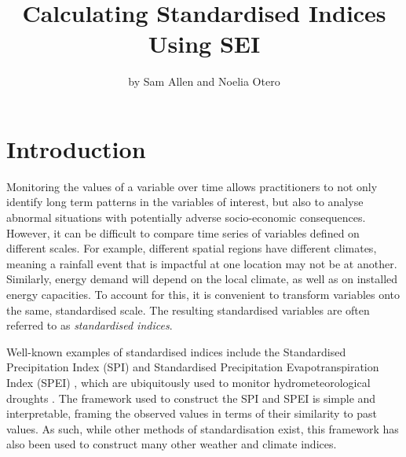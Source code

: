 \title{Calculating Standardised Indices Using SEI}


\author{by Sam Allen and Noelia Otero}

\maketitle


\section{Introduction}\label{introduction}

Monitoring the values of a variable over time allows practitioners to not only identify long term patterns in the variables of interest, but also to analyse abnormal situations with potentially adverse socio-economic consequences. However, it can be difficult to compare time series of variables defined on different scales. For example, different spatial regions have different climates, meaning a rainfall event that is impactful at one location may not be at another. Similarly, energy demand will depend on the local climate, as well as on installed energy capacities. To account for this, it is convenient to transform variables onto the same, standardised scale. The resulting standardised variables are often referred to as \emph{standardised indices}.

Well-known examples of standardised indices include the Standardised Precipitation Index (SPI) \citep{MckeeEtAl1993} and Standardised Precipitation Evapotranspiration Index (SPEI) \citep{VicenteEtAl2010}, which are ubiquitously used to monitor hydrometeorological droughts \citep{BegueriaEtAl2014}. The framework used to construct the SPI and SPEI is simple and interpretable, framing the observed values in terms of their similarity to past values. As such, while other methods of standardisation exist, this framework has also been used to construct many other weather and climate indices.

